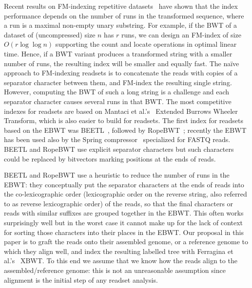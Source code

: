{Recent results on FM-indexing repetitive datasets~\cite{gagie2020fully} have shown that the index performance depends on the number of runs in the transformed sequence, where a run is a maximal non-empty unary substring. For example, if the BWT of a dataset of (uncompressed) size $n$ has $r$ runs, we can design an FM-index of size $O(r \log\log n)$ supporting the count and locate operations in optimal linear time. Hence, if a BWT variant produces a transformed string with a smaller number of runs, the resulting index will be smaller and equally fast.} The na\"ive approach to FM-indexing readsets is to concatenate the reads with copies of a separator character between them, and FM-index the resulting single string.  However, computing the BWT of such a long string is a challenge and each separator character causes several runs in that BWT.  The most competitive indexes for readsets are based on Mantaci et al.'s~\cite{MANTACI2007298} Extended Burrows Wheeler Transform, which is also easier to build for readsets.  
The first index for readsets based on the EBWT was BEETL~\cite{Beetl}, followed by RopeBWT~\cite{ropebwt2}; recently the EBWT has been used also by the Spring compressor~\cite{spring} specialized for FASTQ reads. BEETL and RopeBWT use explicit separator characters but such characters could be replaced by bitvectors marking positions at the ends of reads. %


BEETL and RopeBWT use a heuristic to reduce the number of runs in the EBWT: they conceptually put the separator characters at the ends of reads into the co-lexicographic order (lexicographic order on the reverse string, also referred to as reverse lexicographic order) of the reads, so that the final characters or reads with similar suffixes are grouped together in the EBWT.  This often works surprisingly well but in the worst case it cannot make up for the lack of context for sorting those characters into their places in the EBWT.  Our proposal in this paper is to graft the reads onto their assembled genome, or a reference genome to which they align well, and index the resulting labelled tree with Ferragina et al.'s~\cite{ferragina2009compressing} XBWT.
To this end we assume that we know how the reads align to the assembled/reference genome: this is not an unreasonable assumption since alignment is the initial step of any readset analysis.

